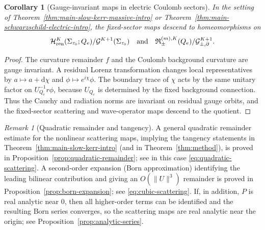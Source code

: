 \documentclass[11pt]{article}
\numberwithin{equation}{section}
\theoremstyle{plain}
\newtheorem{corollary}[theorem]{Corollary}
\theoremstyle{definition}
\theoremstyle{remark}
\newtheorem{remark}{Remark}[section]
\newcommand{\dd}{\mathrm{d}}
\begin{document}
\begin{corollary}[Gauge-invariant maps in electric Coulomb sectors]\label{cor:gauge-invariant-electric}
In the setting of Theorem~\ref{thm:main-slow-kerr-massive-intro} or Theorem~\ref{thm:main-schwarzschild-electric-intro}, the fixed-sector maps descend to homeomorphisms on
\begin{equation}
 \mathcal H^{K}_{\mathrm{ren}}(\Sigma_{\tau_0};Q_e)/\mathcal G^{K+1}(\Sigma_{\tau_0})
 \quad\hbox{and}\quad
 \mathfrak R_{\pm}^{(m),K}(Q_e)/\mathcal G^{K+1}_{\pm,\partial}.
\end{equation}
\end{corollary}

\begin{proof}
The curvature remainder \(f\) and the Coulomb background curvature are gauge invariant.  A residual Lorenz transformation changes local representatives by \(a\mapsto a+\dd\chi\) and \(\phi\mapsto e^{i\chi}\phi\).  The boundary trace of \(\chi\) acts by the same unitary factor on \(U_{Q_e}^{-1}r\phi\), because \(U_{Q_e}\) is determined by the fixed background connection.  Thus the Cauchy and radiation norms are invariant on residual gauge orbits, and the fixed-sector scattering and wave-operator maps descend to the quotient.
\end{proof}

\begin{remark}[Quadratic remainder and tangency]\label{rem:tangent}
A general quadratic remainder estimate for the nonlinear scattering maps, implying the tangency statements in Theorem~\ref{thm:main-slow-kerr-intro} (and in Theorem~\ref{thm:method}), is proved in Proposition~\ref{prop:quadratic-remainder}; see in this case \eqref{eq:quadratic-scattering}.
A second-order expansion (Born approximation) identifying the leading bilinear contribution and giving an $O(\|U\|^{3})$ remainder is proved in Proposition~\ref{prop:born-expansion}; see \eqref{eq:cubic-scattering}. If, in addition, $P$ is real analytic near $0$, then all higher-order terms can be identified and the resulting Born series converges, so the scattering maps are real analytic near the origin; see Proposition~\ref{prop:analytic-series}.
\end{remark}
\end{document}
